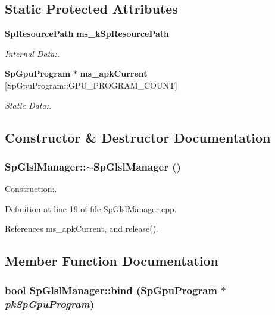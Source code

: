 \subsection*{Static Protected Attributes}
\begin{CompactItemize}
\item 
{\bf Sp\-Resource\-Path} {\bf ms\_\-k\-Sp\-Resource\-Path}
\begin{CompactList}\small\item\em Internal Data:. \item\end{CompactList}\item 
{\bf Sp\-Gpu\-Program} $\ast$ {\bf ms\_\-apk\-Current} [Sp\-Gpu\-Program::GPU\_\-PROGRAM\_\-COUNT]
\begin{CompactList}\small\item\em Static Data:. \item\end{CompactList}\end{CompactItemize}


\subsection{Constructor \& Destructor Documentation}
\subsubsection{\setlength{\rightskip}{0pt plus 5cm}Sp\-Glsl\-Manager::$\sim${\bf Sp\-Glsl\-Manager} ()}\label{classSpark_1_1SpGlslManager_a0}


Construction:. 

Definition at line 19 of file Sp\-Glsl\-Manager.cpp.

References ms\_\-apk\-Current, and release().

\subsection{Member Function Documentation}
\subsubsection{\setlength{\rightskip}{0pt plus 5cm}bool Sp\-Glsl\-Manager::bind ({\bf Sp\-Gpu\-Program} $\ast$ {\em pk\-Sp\-Gpu\-Program})\hspace{0.3cm}{\tt  [static]}}\label{classSpark_1_1SpGlslManager_e1}


